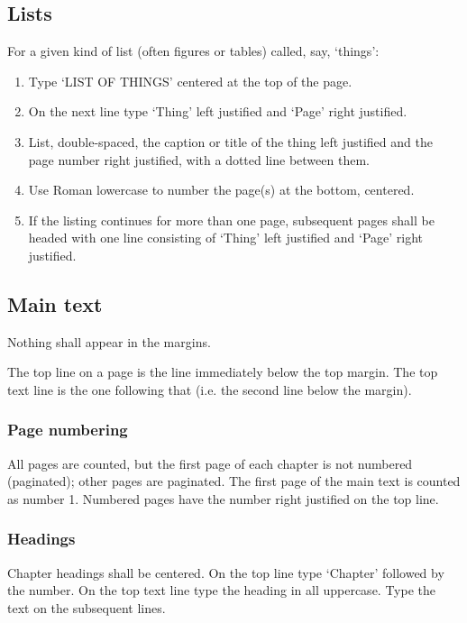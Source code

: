 \subsection{Lists}

    For a given kind of list (often figures or tables) called, say, `things':
\begin{enumerate}
\item Type `LIST OF THINGS' centered at the top of the page.
\item On the next line type `Thing' left justified and `Page' right justified.
\item List, double-spaced, the caption or title of the thing left justified
and the page number right justified, with a dotted line between them.
\item Use Roman lowercase to number the page(s) at the bottom, centered.
\item If the listing continues for more than one page, subsequent pages
shall be headed with one line consisting of `Thing' left justified 
and `Page' right justified.
\end{enumerate}

\subsection{Main text}

    Nothing shall appear in the margins.

    The top line on a page is the line immediately below the top margin.
The top text line is the one following that (i.e. the second line below
the margin).

\subsubsection{Page numbering}

    All pages are counted, but the first page of each chapter is not 
numbered (paginated); other pages are paginated. The first page of the 
main text is counted as number 1. Numbered pages have the number right 
justified on the top line.

\subsubsection{Headings}

   Chapter headings shall be centered. On the top line type `Chapter' followed
by the number. On the top text line type the heading in all uppercase. 
Type the text on the subsequent lines.

